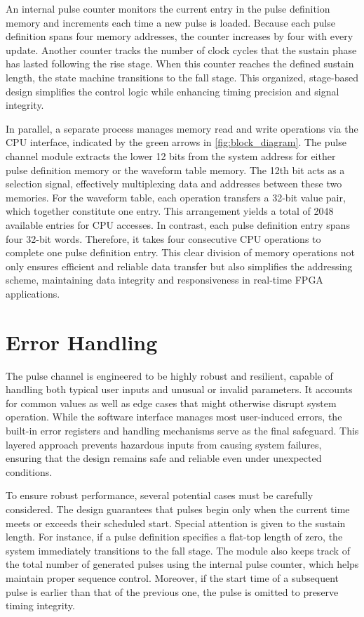 An internal pulse counter monitors the current entry in the pulse definition memory and increments each time a new pulse is loaded. Because each pulse definition spans four memory addresses, the counter increases by four with every update. Another counter tracks the number of clock cycles that the sustain phase has lasted following the rise stage. When this counter reaches the defined sustain length, the state machine transitions to the fall stage. This organized, stage-based design simplifies the control logic while enhancing timing precision and signal integrity. 

In parallel, a separate process manages memory read and write operations via the CPU interface, indicated by the green arrows in \autoref{fig:block_diagram}. The pulse channel module extracts the lower 12 bits from the system address for either pulse definition memory or the waveform table memory. The 12th bit acts as a selection signal, effectively multiplexing data and addresses between these two memories. For the waveform table, each operation transfers a 32-bit value pair, which together constitute one entry. This arrangement yields a total of 2048 available entries for CPU accesses. In contrast, each pulse definition entry spans four 32-bit words. Therefore, it takes four consecutive CPU operations to complete one pulse definition entry. This clear division of memory operations not only ensures efficient and reliable data transfer but also simplifies the addressing scheme, maintaining data integrity and responsiveness in real-time FPGA applications.

\section{Error Handling}

The pulse channel is engineered to be highly robust and resilient, capable of handling both typical user inputs and unusual or invalid parameters. It accounts for common values as well as edge cases that might otherwise disrupt system operation. While the software interface manages most user-induced errors, the built-in error registers and handling mechanisms serve as the final safeguard. This layered approach prevents hazardous inputs from causing system failures, ensuring that the design remains safe and reliable even under unexpected conditions.

To ensure robust performance, several potential cases must be carefully considered. The design guarantees that pulses begin only when the current time meets or exceeds their scheduled start. Special attention is given to the sustain length. For instance, if a pulse definition specifies a flat-top length of zero, the system immediately transitions to the fall stage. The module also keeps track of the total number of generated pulses using the internal pulse counter, which helps maintain proper sequence control. Moreover, if the start time of a subsequent pulse is earlier than that of the previous one, the pulse is omitted to preserve timing integrity.

